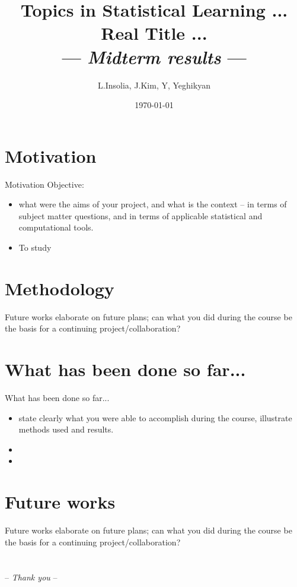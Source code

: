\documentclass{beamer}
\title[Topics in Statistical Learning]{ \textcolor{bscuro}{Topics in Statistical Learning ... Real Title ... } \\
	\small \textcolor{rscuro}{ --- \emph{Midterm results} --- }}
\author{L.Insolia, J.Kim, Y, Yeghikyan}
\institute{SNS}
\date{\today}
\begin{document}
	
\begin{frame}

  \titlepage
\end{frame}



\section{Motivation}
\begin{frame}{Motivation}
Objective:
\begin{itemize}
  \item what were the aims of your project, and what is the context – in terms of subject matter questions, and in terms of applicable statistical and computational tools. 
  \item To study 
\end{itemize}
\vskip 1cm
\end{frame}


\section{Methodology}
\begin{frame}{Future works}
elaborate on future plans; can what you did during the course be the basis for a continuing project/collaboration? 
\end{frame}



\section{What has been done so far...}
\begin{frame}{What has been done so far...}
\begin{itemize}
\item state clearly what you were able to accomplish during the course, illustrate methods used and results.
\item 
\item 
\end{itemize}
\end{frame}


\section{Future works}
\begin{frame}{Future works}
 elaborate on future plans; can what you did during the course be the basis for a continuing project/collaboration? 

\end{frame}

\section{}
\begin{frame}
\centerline{\Huge\textcolor{bscuro}{ -- \emph{Thank you} -- }}
\end{frame}
\end{document}
